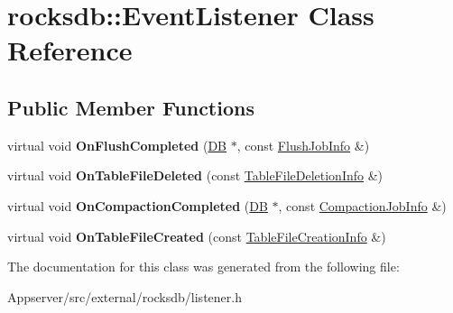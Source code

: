 \hypertarget{classrocksdb_1_1EventListener}{}\section{rocksdb\+:\+:Event\+Listener Class Reference}
\label{classrocksdb_1_1EventListener}
\subsection*{Public Member Functions}
\begin{DoxyCompactItemize}
\item 
virtual void {\bfseries On\+Flush\+Completed} (\hyperlink{classrocksdb_1_1DB}{DB} $\ast$, const \hyperlink{structrocksdb_1_1FlushJobInfo}{Flush\+Job\+Info} \&)\hypertarget{classrocksdb_1_1EventListener_a8fcc86998faf5d9f6f078b92ff3f6e7d}{}\label{classrocksdb_1_1EventListener_a8fcc86998faf5d9f6f078b92ff3f6e7d}

\item 
virtual void {\bfseries On\+Table\+File\+Deleted} (const \hyperlink{structrocksdb_1_1TableFileDeletionInfo}{Table\+File\+Deletion\+Info} \&)\hypertarget{classrocksdb_1_1EventListener_a0c108c91575be66bd451d00046f058f6}{}\label{classrocksdb_1_1EventListener_a0c108c91575be66bd451d00046f058f6}

\item 
virtual void {\bfseries On\+Compaction\+Completed} (\hyperlink{classrocksdb_1_1DB}{DB} $\ast$, const \hyperlink{structrocksdb_1_1CompactionJobInfo}{Compaction\+Job\+Info} \&)\hypertarget{classrocksdb_1_1EventListener_a9d73a0ed8e6558c4b20d34935c26b68e}{}\label{classrocksdb_1_1EventListener_a9d73a0ed8e6558c4b20d34935c26b68e}

\item 
virtual void {\bfseries On\+Table\+File\+Created} (const \hyperlink{structrocksdb_1_1TableFileCreationInfo}{Table\+File\+Creation\+Info} \&)\hypertarget{classrocksdb_1_1EventListener_a3d03220a975dd2bf67fbdd22c52cff3f}{}\label{classrocksdb_1_1EventListener_a3d03220a975dd2bf67fbdd22c52cff3f}

\end{DoxyCompactItemize}


The documentation for this class was generated from the following file\+:\begin{DoxyCompactItemize}
\item 
Appserver/src/external/rocksdb/listener.\+h\end{DoxyCompactItemize}
